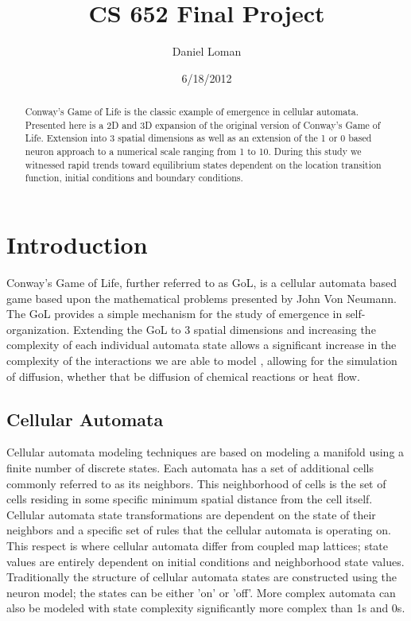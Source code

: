 \documentclass[11pt,twocolumn]{article}
\title{\textbf{CS 652 Final Project }}
\author{Daniel Loman}
\date{6/18/2012}
\begin{document}
\maketitle
\begin{abstract}
Conway's Game of Life is the classic example of emergence in cellular automata. Presented here is a 2D and 3D expansion of the original version of Conway's Game of Life. Extension into 3 spatial dimensions as well as an extension of the 1 or 0 based neuron approach to a numerical scale ranging from 1 to 10. During this study we witnessed rapid trends toward equilibrium states dependent on the location transition function, initial conditions and boundary conditions.
\end{abstract}
\section{Introduction}
Conway's Game of Life, further referred to as GoL, is a cellular automata based game based upon the mathematical problems presented by John Von Neumann. The GoL provides a simple mechanism for the study of emergence in self-organization.\cite{arc02}
Extending the GoL to 3 spatial dimensions and increasing the complexity of each individual automata state allows a significant increase in the complexity of the interactions we are able to model
, allowing for the simulation of diffusion, whether that be diffusion of chemical reactions or heat flow.  
\subsection{Cellular Automata}
 Cellular automata modeling techniques are based on modeling a manifold 
 using a finite number of discrete states. 
 Each automata has a set of additional cells commonly referred to as its neighbors.\cite{boc} 
 This neighborhood of cells is the set of cells residing in some specific minimum spatial distance from the cell itself. 
 Cellular automata state transformations are dependent on the state of their neighbors and a specific set of rules that the cellular automata is operating on.\cite{guinot}
 This respect is where cellular automata differ from coupled map lattices; state values are entirely dependent on initial conditions and neighborhood state values.
 Traditionally the structure of cellular automata states are constructed using the neuron model; the states can be either 'on' or 'off'. 
 More complex automata can also be modeled with state complexity significantly more complex than 1s and 0s.\cite{wolfram}
\end{document}
